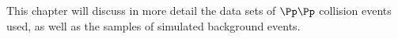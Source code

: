 
 \label{sec:selections}

This chapter will discuss in more detail the data sets of $\Pp\Pp$ collision events used, as well as the samples of simulated background events.



